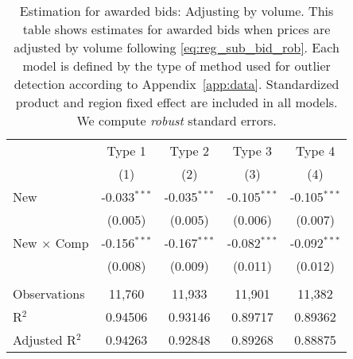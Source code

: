 
\begin{table}[H]
   \label{app:tab:volume_adj_awarded}
   \centering
   \begin{tabular}{lcccc}
      \toprule
                                & Type 1         & Type 2         & Type 3         & Type 4 \\   
                                & (1)            & (2)            & (3)            & (4)\\  
      \midrule 
      New                       & -0.033$^{***}$ & -0.035$^{***}$ & -0.105$^{***}$ & -0.105$^{***}$\\   
                                & (0.005)        & (0.005)        & (0.006)        & (0.007)\\   
      New $\times$ Comp  & -0.156$^{***}$ & -0.167$^{***}$ & -0.082$^{***}$ & -0.092$^{***}$\\   
                                & (0.008)        & (0.009)        & (0.011)        & (0.012)\\   
       \\
      Observations              & 11,760         & 11,933         & 11,901         & 11,382\\  
      R$^2$                     & 0.94506        & 0.93146        & 0.89717        & 0.89362\\  
      Adjusted R$^2$            & 0.94263        & 0.92848        & 0.89268        & 0.88875\\  
      \bottomrule
   \end{tabular}
   
   \par \raggedright 
   \caption{\label{tab:estadj_vol} Estimation for awarded bids: Adjusting by volume. This table shows estimates for awarded bids when prices are adjusted by volume following \eqref{eq:reg_sub_bid_rob}. Each model is defined by the type of method used for outlier detection according to Appendix~\ref{app:data}. Standardized product and region fixed effect are included in all models. We compute \textit{robust} standard errors.}
\end{table}


